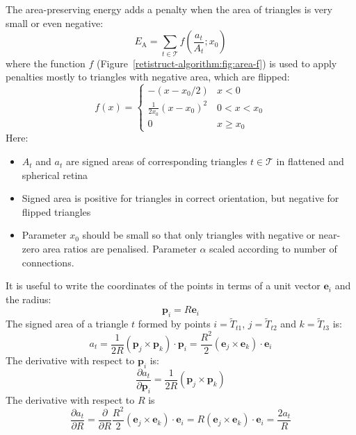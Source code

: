 \documentclass{article}
\newcommand{\EA}{\ensuremath{E_\mathrm{A}}\xspace}
\renewcommand{\vec}[1]{\mathbf{#1}}
\begin{document}
The area-preserving energy adds a penalty when the area of triangles
is very small or even negative:
\begin{equation}
 \EA = \sum_{t\in\mathcal{T}} f\left(\frac{a_t}{A_t}; x_0\right)
\end{equation}
where the function $f$ (Figure~\ref{retistruct-algorithm:fig:area-f}) is used to apply penalties mostly to
triangles with negative area, which are flipped:
\begin{equation}
  \label{retistruct-algorithm:eq:3}
  f(x) = \left\{
    \begin{array}{ll}
      -(x - x_0/2) & x < 0 \\
      \frac{1}{2x_0}(x - x_0)^2 & 0 < x <x_0 \\
      0 & x \ge x_0
    \end{array} \right.
\end{equation}
Here:
\begin{itemize}
\item $A_t$ and $a_t$ are signed areas of corresponding triangles
  $t\in\mathcal{T}$ in flattened and spherical retina
\item Signed area is positive for triangles in correct orientation,
  but negative for flipped triangles
\item Parameter $x_0$ should be small so that only triangles with
  negative or near-zero area ratios are penalised. Parameter $\alpha$
  scaled according to number of connections.
\end{itemize}

It is useful to write the coordinates of the points in terms of a unit
vector $\vec{e}_i$ and the radius:
\begin{equation}
  \label{retistruct-algorithm:eq:13}
  \vec{p}_i = R\vec{e}_i
\end{equation}
The signed area of a triangle $t$ formed by points $i=\tilde T_{t1}$,
$j=\tilde T_{t2}$ and $k=\tilde T_{t3}$ is:
\begin{equation}
  \label{retistruct-algorithm:eq:11}
  a_t = \frac{1}{2R} (\vec{p}_j\times \vec{p}_k)\cdot \vec{p}_i = \frac{R^2}{2} (\vec{e}_j\times \vec{e}_k)\cdot \vec{e}_i
\end{equation}
The derivative with respect to $\vec{p}_i$ is:
\begin{equation}
  \frac{\partial a_t}{\partial \vec{p}_i} = \frac{1}{2R} (\vec{p}_j\times \vec{p}_k)
\end{equation}
The derivative with respect to $R$ is 
\begin{equation}
  \label{retistruct-algorithm:eq:14}
  \frac{\partial a_t}{\partial R} =
  \frac{\partial}{\partial R} \frac{R^2}{2} (\vec{e}_j\times
  \vec{e}_k)\cdot \vec{e}_i
  = R (\vec{e}_j\times \vec{e}_k)\cdot \vec{e}_i = \frac{2a_t}{R}
\end{equation}
\end{document}
